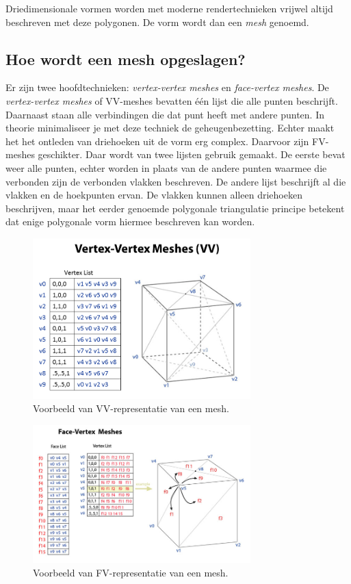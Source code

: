 \documentclass[12pt, a4paper]{article}
\begin{document}
Driedimensionale vormen worden met moderne rendertechnieken vrijwel altijd beschreven met deze polygonen. De vorm wordt dan een \emph{mesh} genoemd.

\subsection{Hoe wordt een mesh opgeslagen?}
Er zijn twee hoofdtechnieken: \emph{vertex-vertex meshes} \cite{VVSystems} en \emph{face-vertex meshes}. De \emph{vertex-vertex meshes} of VV-meshes bevatten één lijst die alle punten beschrijft. Daarnaast staan alle verbindingen die dat punt heeft met andere punten. In theorie minimaliseer je met deze techniek de geheugenbezetting. Echter maakt het het ontleden van driehoeken uit de vorm erg complex. Daarvoor zijn FV-meshes geschikter. Daar wordt van twee lijsten gebruik gemaakt. De eerste bevat weer alle punten, echter worden in plaats van de andere punten waarmee die verbonden zijn de verbonden vlakken beschreven. De andere lijst beschrijft al die vlakken en de hoekpunten ervan. De vlakken kunnen alleen driehoeken beschrijven, maar het eerder genoemde polygonale triangulatie principe betekent dat enige polygonale vorm hiermee beschreven kan worden.

\begin{figure}[H]
    \centering
    \includegraphics[width=0.75\textwidth]{Vertex-Vertex_Meshes.png}
    \caption{Voorbeeld van VV-representatie van een mesh.}
    \label{fig:vertex_vertex}
\end{figure}

\begin{figure}[H]
    \centering
    \includegraphics[width=0.75\textwidth]{Face-Vertex_Meshes.jpg}
    \caption{Voorbeeld van FV-representatie van een mesh.}
    \label{fig:face_vertex}
\end{figure}
\end{document}
